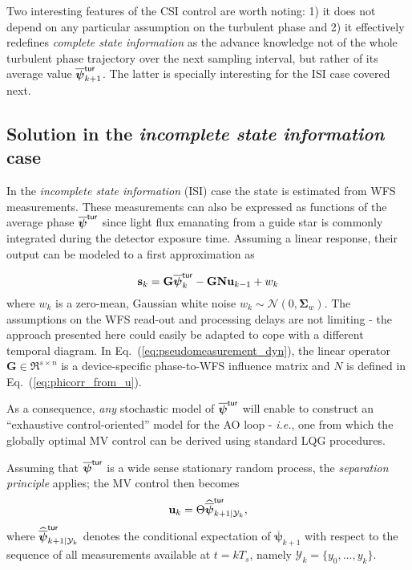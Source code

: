 \documentclass[a4paper,12pt]{article}
\newcommand{\0}{\mathsf{0}} %
\newcommand{\CovMat}{\boldsymbol{\Sigma}} %
\newcommand{\N}{\mathbf{N}} %
\newcommand{\D}{\mathbf{G}} %
\newcommand{\tur}{\mathsf{\tiny{tur}}}
\newcommand{\phivec}{{\boldsymbol{\psi}}}
\newcommand{\svec}{{\mathbf{s}}}
\newcommand{\uvec}{{\mathbf{u}}}
\begin{document}
        Two interesting features of the CSI control are worth noting:
        1) it does not depend on any particular assumption on the
        turbulent phase and
        2) it effectively redefines \emph{complete state information}
        as the advance knowledge not 
        of the whole turbulent phase trajectory over the next sampling
        interval, but 
        rather of its average value $\overline\phivec_{k+1}^\tur$. The latter is specially
        interesting for the ISI case covered next.

        \subsection{Solution in the \emph{incomplete state
            information} case}

        In the \emph{incomplete state
            information} (ISI) case the state is estimated from WFS measurements. These measurements can also be expressed as functions of
        the average phase
        $\overline{\phivec }^{\tur}$ since light flux emanating from
        a guide star is commonly integrated during the detector
        exposure time.
        Assuming a linear response, their output can be
        modeled to a first approximation as

        \begin{equation}\label{eq:pseudomeasurement_dyn}
          \svec_{k} = \D \overline{\phivec }_{k}^{\tur}-\D\N \uvec_{k-1}+w_{k}
        \end{equation}
        where $w_k$ is a zero-mean, Gaussian white noise $w_k \sim
        \mathcal{N}(0, \CovMat_{w})$. The assumptions on the WFS
        read-out and processing delays are not limiting - the
        approach presented here could easily be adapted to cope with a
        different temporal diagram. In
        Eq.~(\ref{eq:pseudomeasurement_dyn}), the linear operator 
        $\D \in \Re^{s \times n}$ is a device-specific phase-to-WFS 
        influence matrix and $N$ is defined in
        Eq.~(\ref{eq:phicorr_from_u}). 

        As a consequence, \emph{any} stochastic model of $\overline{\phivec }^{\tur}$ will enable to construct an
        ``exhaustive control-oriented'' model for the AO loop - \emph{i.e.}, one from
        which the globally optimal MV control can be derived using standard LQG
        procedures.\ 
        
        Assuming that $\overline{\phivec }^{\tur}$ is a wide sense stationary
        random process, the \textit{separation
          principle}
        applies; the MV control then becomes 
        \begin{equation}\label{eq10}
          \uvec_{k}=\Theta\widehat{\overline{%
              \phivec}}_{k+1\mid \mathcal{Y}_k}^{\tur},
        \end{equation}%
        where $\widehat{\overline{\phivec }}_{k+1\mid \mathcal{Y}_k}^{\tur}$
        denotes the conditional expectation of $\overline{\phivec }_{k+1}$
        with respect to the sequence of all measurements available at
        $t=kT_s$, namely  $\mathcal{Y}_k = \{y_{0},\ldots ,y_{k}\}$. 
\end{document}
